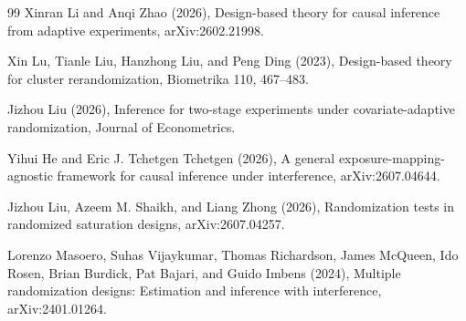\documentclass{article}
\begin{document}
\begin{thebibliography}{99}
   Xinran Li and Anqi Zhao (2026), Design-based theory for causal inference from adaptive experiments, arXiv:2602.21998.

   Xin Lu, Tianle Liu, Hanzhong Liu, and Peng Ding (2023), Design-based theory for cluster rerandomization, Biometrika 110, 467--483.

   Jizhou Liu (2026), Inference for two-stage experiments under covariate-adaptive randomization, Journal of Econometrics.

   Yihui He and Eric J. Tchetgen Tchetgen (2026), A general exposure-mapping-agnostic framework for causal inference under interference, arXiv:2607.04644.

   Jizhou Liu, Azeem M. Shaikh, and Liang Zhong (2026), Randomization tests in randomized saturation designs, arXiv:2607.04257.

   Lorenzo Masoero, Suhas Vijaykumar, Thomas Richardson, James McQueen, Ido Rosen, Brian Burdick, Pat Bajari, and Guido Imbens (2024), Multiple randomization designs: Estimation and inference with interference, arXiv:2401.01264.

\end{thebibliography}
\end{document}
